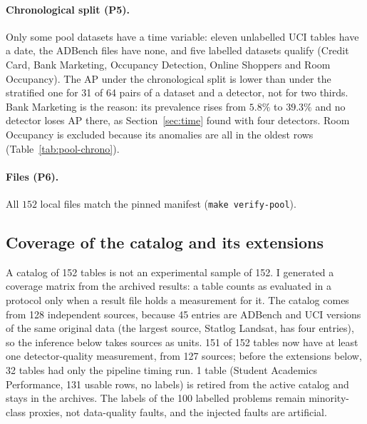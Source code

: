 \documentclass[conference]{IEEEtran}
\begin{document}
\paragraph{Chronological split (P5).} Only some pool datasets have a time variable: eleven unlabelled UCI tables have a date, the ADBench files have none, and five labelled datasets qualify (Credit Card, Bank Marketing, Occupancy Detection, Online Shoppers and Room Occupancy). The AP under the chronological split is lower than under the stratified one for 31 of 64 pairs of a dataset and a detector, not for two thirds. Bank Marketing is the reason: its prevalence rises from $5.8\%$ to $39.3\%$ and no detector loses AP there, as Section~\ref{sec:time} found with four detectors. Room Occupancy is excluded because its anomalies are all in the oldest rows (Table~\ref{tab:pool-chrono}).

\paragraph{Files (P6).} All $152$ local files match the pinned manifest (\texttt{make verify-pool}).

\subsection{Coverage of the catalog and its extensions}
\label{sec:coverage-v2}
A catalog of 152 tables is not an experimental sample of 152. I generated a coverage matrix from the archived results: a table counts as evaluated in a protocol only when a result file holds a measurement for it. The catalog comes from 128 independent sources, because 45 entries are ADBench and UCI versions of the same original data (the largest source, Statlog Landsat, has four entries), so the inference below takes sources as units. 151 of 152 tables now have at least one detector-quality measurement, from 127 sources; before the extensions below, 32 tables had only the pipeline timing run. 1 table (Student Academics Performance, 131 usable rows, no labels) is retired from the active catalog and stays in the archives. The labels of the 100 labelled problems remain minority-class proxies, not data-quality faults, and the injected faults are artificial.
\end{document}
